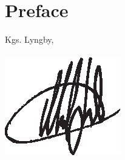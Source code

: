 

\begingroup
\let\clearpage\relax
\let\cleardoublepage\relax
\let\cleardoublepage\relax

\chapter*{Preface}
%
%

\vspace{20mm}
\mbox{}\hfill
\begin{minipage}[t]{80mm}
  Kgs. Lyngby, \myDate
  \\ \\
  \mbox{} \hspace{-16mm} \includegraphics{img/signature.eps}
  \myName
\end{minipage}

\endgroup			

\vfill
